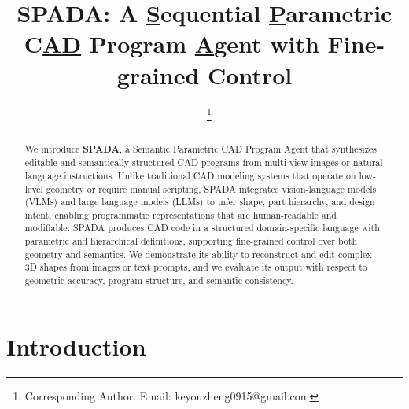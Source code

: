 \documentclass[doubleblind]{ecai}
\begin{document}
\begin{frontmatter}


  \title{SPADA: A \underline{S}equential \underline{P}arametric C\underline{AD} Program \underline{A}gent with Fine-grained Control}

  \author[A]{
    ~
    \thanks{Corresponding Author. Email: keyouzheng0915@gmail.com}
  }

  \address[A]{Guangdong University of Technology}

  \begin{abstract}
    We introduce \textbf{SPADA}, a Semantic Parametric CAD Program Agent that synthesizes editable and semantically structured CAD programs from multi-view images or natural language instructions. Unlike traditional CAD modeling systems that operate on low-level geometry or require manual scripting, SPADA integrates vision-language models (VLMs) and large language models (LLMs) to infer shape, part hierarchy, and design intent, enabling programmatic representations that are human-readable and modifiable. SPADA produces CAD code in a structured domain-specific language with parametric and hierarchical definitions, supporting fine-grained control over both geometry and semantics. We demonstrate its ability to reconstruct and edit complex 3D shapes from images or text prompts, and we evaluate its output with respect to geometric accuracy, program structure, and semantic consistency.
  \end{abstract}

\end{frontmatter}


\section{Introduction}
\end{document}
